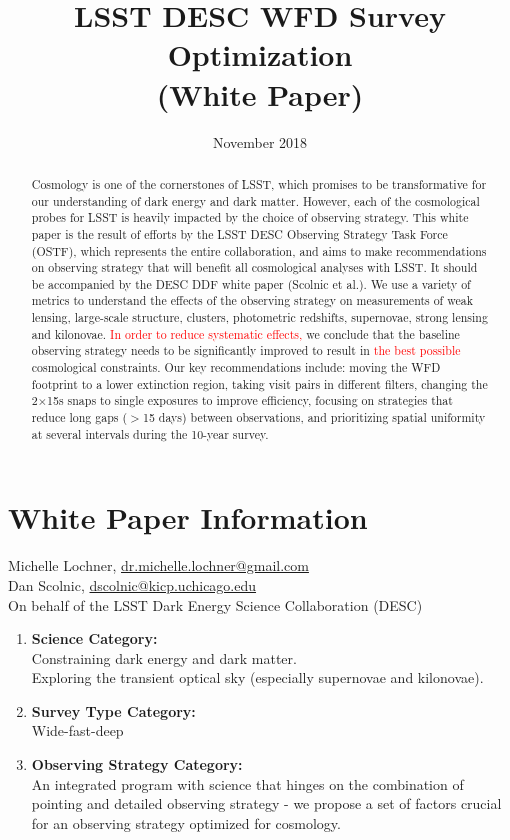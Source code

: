 \documentclass[12pt, letterpaper]{article}
\title{LSST DESC WFD Survey Optimization \\(White Paper)}
\author{}
\date{November 2018}
\newcommand{\review}[1]{{\textcolor{red}{#1}}}
\begin{document}
\maketitle

\begin{abstract}
Cosmology is one of the cornerstones of LSST, which promises to be transformative for our understanding of dark energy and dark matter. However, each of the cosmological probes for LSST is heavily impacted by the choice of observing strategy.
This white paper is the result of efforts by the LSST DESC Observing Strategy Task Force (OSTF), which represents the entire collaboration, and aims to make recommendations on observing strategy that will benefit all cosmological analyses with LSST. It should be accompanied by the DESC DDF white paper (Scolnic et al.). We use a variety of metrics to understand the effects of the observing strategy on measurements of weak lensing, large-scale structure, clusters, photometric redshifts, supernovae, strong lensing and kilonovae. \review{In order to reduce systematic effects,} we conclude that the baseline observing strategy needs to be significantly improved to result in \review{the best possible} cosmological constraints.  
Our key recommendations include: moving the WFD footprint to a lower extinction region, taking visit pairs in different filters, changing the 2$\times$15s snaps to single exposures to improve efficiency, focusing on strategies that reduce long gaps ($>$15 days) between observations, and prioritizing spatial uniformity at several intervals during the 10-year survey.
\end{abstract}

\newpage
\section{White Paper Information}
Michelle Lochner, \url{dr.michelle.lochner@gmail.com}\\
Dan Scolnic, \url{dscolnic@kicp.uchicago.edu}\\
On behalf of the LSST Dark Energy Science Collaboration (DESC) %
\\

\begin{enumerate} 
\item {\bf Science Category:}\\
Constraining dark energy and dark matter.\\
Exploring the transient optical sky (especially supernovae and kilonovae).\\
\item {\bf Survey Type Category:}\\
    Wide-fast-deep
\item {\bf Observing Strategy Category:}\\ 
An integrated program with science that hinges on the combination of pointing and detailed 
	observing strategy - we propose a set of factors crucial for an observing strategy optimized for cosmology.
\end{enumerate}  
\end{document}
